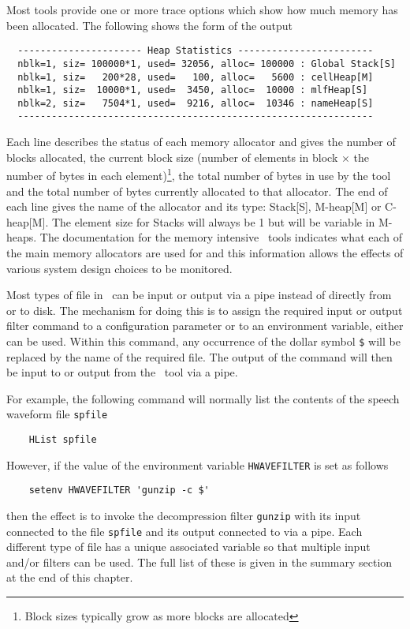 Most tools provide one or more trace options which show how
much memory has been allocated.  The following shows the form of
the output
\begin{verbatim}
  ---------------------- Heap Statistics ------------------------
  nblk=1, siz= 100000*1, used= 32056, alloc= 100000 : Global Stack[S]
  nblk=1, siz=   200*28, used=   100, alloc=   5600 : cellHeap[M]
  nblk=1, siz=  10000*1, used=  3450, alloc=  10000 : mlfHeap[S]
  nblk=2, siz=   7504*1, used=  9216, alloc=  10346 : nameHeap[S]
  ---------------------------------------------------------------
\end{verbatim}
Each line describes the status of each memory allocator and gives the number of
blocks allocated, the current block size (number of elements in block $\times$
the number of bytes in each element)\footnote{ Block sizes typically grow as
more blocks are allocated}, the total number of bytes in use by the tool and
the total number of bytes currently allocated to that allocator.  The end of
each line gives the name of the allocator and its type: Stack[S], M-heap[M] or
C-heap[M].  The element size for Stacks will always be 1 but will be variable
in M-heaps. The documentation for the memory
intensive \HTK\ tools indicates what each of the main memory allocators are
used for and this information allows the effects of various system design
choices to be monitored.


Most types of file in \HTK\ can be input or output via a pipe
instead of directly from or to disk.  The mechanism for doing this is to assign
the required input or output filter command to a
configuration parameter or to an environment variable, either can be used.
Within this command, any occurrence of the dollar symbol
\verb+$+ will be replaced by the name of the required file. The
output of the command will then be input to or output from the \HTK\ tool via a
pipe.

For example, the following command will
normally list the contents of the speech waveform file \texttt{spfile}
\begin{verbatim}
    HList spfile
\end{verbatim}
However, if the value of the environment variable \texttt{HWAVEFILTER}
is set as follows
\begin{verbatim}
    setenv HWAVEFILTER 'gunzip -c $'
\end{verbatim}
then the effect is to invoke the decompression filter \texttt{gunzip} with its input connected to the file \texttt{spfile}
and its output connected to  via a pipe.  Each different type of
file has a unique associated variable so that multiple input and/or filters can
be used.  The full list of these is given in the summary section at the end of
this chapter.

